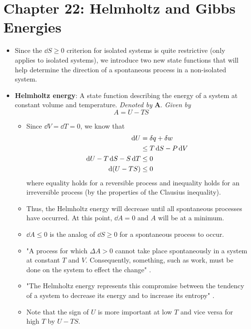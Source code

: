 \documentclass[../notes.tex]{subfiles}
\begin{document}
\section{Chapter 22: Helmholtz and Gibbs Energies}
\begin{itemize}
    \item {}Since the $\dd{S}\geq 0$ criterion for isolated systems is quite restrictive (only applies to isolated systems), we introduce two new state functions that will help determine the direction of a spontaneous process in a non-isolated system.
    \item \textbf{Helmholtz energy}: A state function describing the energy of a system at constant volume and temperature. \emph{Denoted by} $\bm{A}$. \emph{Given by}
    \begin{equation*}
        A = U-TS
    \end{equation*}
    \begin{itemize}
        \item Since $\dd{V}=\dd{T}=0$, we know that
        \begin{align*}
            \dd{U} &= \var{q}+\var{w}\\
            &\leq T\dd{S}-P\dd{V}\\
            \dd{U}-T\dd{S}-S\dd{T} &\leq 0\\
            \dd{(U-TS)} &\leq 0
        \end{align*}
        where equality holds for a reversible process and inequality holds for an irreversible process (by the properties of the Clausius inequality).
        \item Thus, the Helmholtz energy will decrease until all spontaneous processes have occurred. At this point, $\dd{A}=0$ and $A$ will be at a minimum.
        \item $\dd{A}\leq 0$ is the analog of $\dd{S}\geq 0$ for a spontaneous process to occur.
        \item "A process for which $\Delta A>0$ cannot take place spontaneously in a system at constant $T$ and $V$. Consequently, something, such as work, must be done on the system to effect the change" \parencite[883]{bib:McQuarrieSimon}.
        \item "The Helmholtz energy represents this compromise between the tendency of a system to decrease its energy and to increase its entropy" \parencite[883]{bib:McQuarrieSimon}.
        \item Note that the sign of $U$ is more important at low $T$ and vice versa for high $T$ by $U-TS$.

\end{itemize}
\end{itemize}
\end{document}
